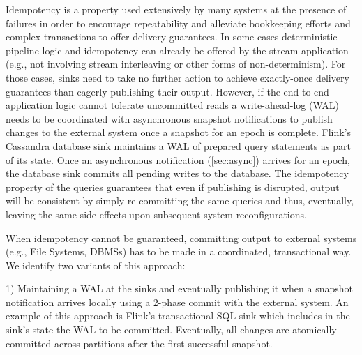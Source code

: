  Idempotency is a property used extensively by many systems at the presence of failures in order to encourage repeatability and alleviate bookkeeping efforts and complex transactions to offer delivery guarantees\cite{CUSTOM:web/SparkStructuredStreaming,millwheel}. In some cases deterministic pipeline logic and idempotency can already be offered by the stream application (e.g., not involving stream interleaving or other forms of non-determinism). For those cases, sinks need to take no further action to achieve exactly-once delivery guarantees than eagerly publishing their output. However, if the end-to-end application logic cannot tolerate uncommitted reads a write-ahead-log (WAL) needs to be coordinated with asynchronous snapshot notifications to publish changes to the external system once a snapshot for an epoch is complete. Flink's Cassandra database sink maintains a WAL of prepared query statements as part of its state. Once an asynchronous notification (\autoref{sec:async}) arrives for an epoch, the database sink commits all pending writes to the database. The idempotency property of the queries guarantees that even if publishing is disrupted, output will be consistent by simply re-committing the same queries and thus, eventually, leaving the same side effects upon subsequent system reconfigurations. 


 When idempotency cannot be guaranteed, committing output to external systems (e.g., File Systems, DBMSs) has to be made in a coordinated, transactional way. We identify two variants of this approach:

1) Maintaining a WAL at the sinks and eventually publishing it when a snapshot notification arrives locally using a 2-phase commit with the external system. An example of this approach is Flink's transactional SQL sink which includes in the sink's state the WAL to be committed. Eventually, all changes are atomically committed across partitions after the first successful snapshot. 


